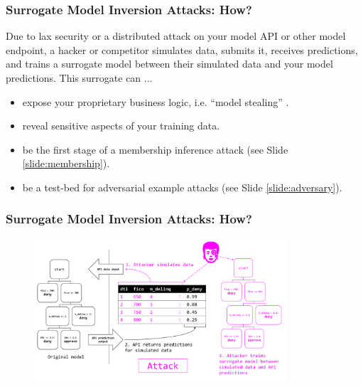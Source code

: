 \documentclass[11pt,
               aspectratio=169,
               hyperref={colorlinks}
               ]{beamer}
\begin{document}
			\begin{frame}
		
				\frametitle{Surrogate Model Inversion Attacks: \textbf{How?}}
				
Due to lax security or a distributed attack on your model API or other model endpoint, a hacker or competitor simulates data, submits it, receives predictions, and trains a surrogate model between their simulated data and your model predictions. This surrogate can ...
				\vspace{10pt}
				\begin{itemize}
				\item expose your proprietary business logic, i.e. ``model stealing'' \cite{model_stealing}. 
				\item reveal sensitive aspects of your training data. 
				\item be the first stage of a membership inference attack (see Slide \ref{slide:membership}).
				\item be a test-bed for adversarial example attacks (see Slide \ref{slide:adversary}). 
				\end{itemize}

			\end{frame}
		
			\begin{frame}[label={slide:inversion}]
		
				\frametitle{Surrogate Model Inversion Attacks: \textbf{How?}}	
			
				\begin{figure}[htb]
					\begin{center}
						\includegraphics[height=150pt]{img/inversion.PNG}
					\end{center}
				\end{figure}	

			\end{frame}
		
\end{document}
